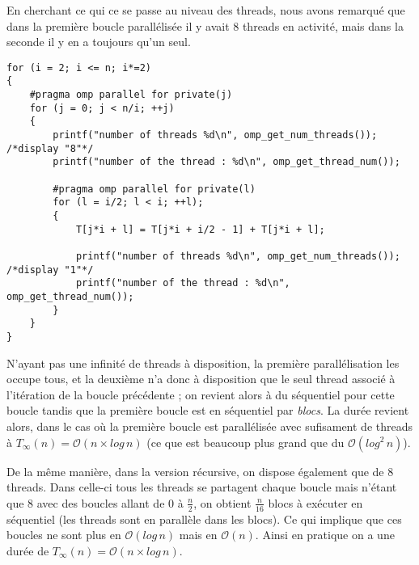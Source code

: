 En cherchant ce qui ce se passe au niveau des threads, nous avons remarqué que dans la première boucle parallélisée il y avait $8$ threads en activité, mais dans la seconde il y en a toujours qu'un seul.

\begin{lstlisting}[style=cilk, title=Parallélisation des boucles itératives avec les commandes OpenMP]
for (i = 2; i <= n; i*=2)
{
	#pragma omp parallel for private(j)
	for (j = 0; j < n/i; ++j)
	{
		printf("number of threads %d\n", omp_get_num_threads()); /*display "8"*/
		printf("number of the thread : %d\n", omp_get_thread_num());
        
		#pragma omp parallel for private(l)
		for (l = i/2; l < i; ++l);
        {
			T[j*i + l] = T[j*i + i/2 - 1] + T[j*i + l];
            
            printf("number of threads %d\n", omp_get_num_threads()); /*display "1"*/
            printf("number of the thread : %d\n", omp_get_thread_num());
		}
	}
}
\end{lstlisting}


N'ayant pas une infinité de threads à disposition, la première parallélisation les occupe tous, et la deuxième n'a donc à disposition que le seul thread associé à l'itération de la boucle précédente ; on revient alors à du séquentiel pour cette boucle tandis que la première boucle est en séquentiel par \emph{blocs}. La durée revient alors, dans le cas où la première boucle est parallélisée avec sufisament de threads à $T_\infty(n) = \mathcal{O} (n \times log \, n)$ (ce que est beaucoup plus grand que du $\mathcal{O}(log^2 \, n)$).

De la même manière, dans la version récursive, on dispose également que de $8$ threads. Dans celle-ci tous les threads se partagent chaque boucle mais n'étant que $8$ avec des boucles allant de $0$ à $\frac{n}{2}$, on obtient $\frac{n}{16}$ blocs à exécuter en séquentiel (les threads sont en parallèle dans les blocs). Ce qui implique que ces boucles ne sont plus en $\mathcal{O} (log \, n)$ mais en $\mathcal{O} (n)$. Ainsi en pratique on a une durée de $T_\infty(n) = \mathcal{O} (n \times log \, n)$.